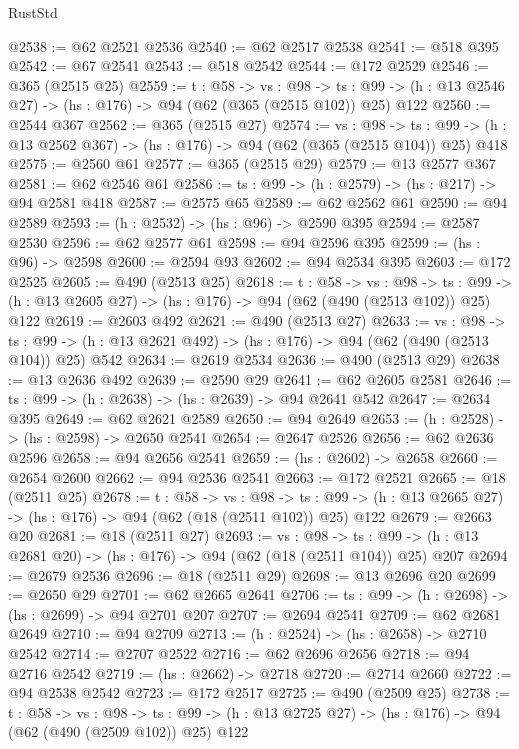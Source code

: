 \begin{lexlean}{RustStd}
\begin{coremodule}
@2538 := @62 @2521 @2536
@2540 := @62 @2517 @2538
@2541 := @518 @395
@2542 := @67 @2541
@2543 := @518 @2542
@2544 := @172 @2529
@2546 := @365 (@2515 @25)
@2559 := {t : @58} ->
  {vs : @98} ->
  {ts : @99} -> (h : @13 @2546 @27) -> (hs : @176) -> @94 (@62 (@365 (@2515 @102)) @25) @122
@2560 := @2544 @367
@2562 := @365 (@2515 @27)
@2574 := {vs : @98} ->
  {ts : @99} -> (h : @13 @2562 @367) -> (hs : @176) -> @94 (@62 (@365 (@2515 @104)) @25) @418
@2575 := @2560 @61
@2577 := @365 (@2515 @29)
@2579 := @13 @2577 @367
@2581 := @62 @2546 @61
@2586 := {ts : @99} -> (h : @2579) -> (hs : @217) -> @94 @2581 @418
@2587 := @2575 @65
@2589 := @62 @2562 @61
@2590 := @94 @2589
@2593 := (h : @2532) -> (hs : @96) -> @2590 @395
@2594 := @2587 @2530
@2596 := @62 @2577 @61
@2598 := @94 @2596 @395
@2599 := (hs : @96) -> @2598
@2600 := @2594 @93
@2602 := @94 @2534 @395
@2603 := @172 @2525
@2605 := @490 (@2513 @25)
@2618 := {t : @58} ->
  {vs : @98} ->
  {ts : @99} -> (h : @13 @2605 @27) -> (hs : @176) -> @94 (@62 (@490 (@2513 @102)) @25) @122
@2619 := @2603 @492
@2621 := @490 (@2513 @27)
@2633 := {vs : @98} ->
  {ts : @99} -> (h : @13 @2621 @492) -> (hs : @176) -> @94 (@62 (@490 (@2513 @104)) @25) @542
@2634 := @2619 @2534
@2636 := @490 (@2513 @29)
@2638 := @13 @2636 @492
@2639 := @2590 @29
@2641 := @62 @2605 @2581
@2646 := {ts : @99} -> (h : @2638) -> (hs : @2639) -> @94 @2641 @542
@2647 := @2634 @395
@2649 := @62 @2621 @2589
@2650 := @94 @2649
@2653 := (h : @2528) -> (hs : @2598) -> @2650 @2541
@2654 := @2647 @2526
@2656 := @62 @2636 @2596
@2658 := @94 @2656 @2541
@2659 := (hs : @2602) -> @2658
@2660 := @2654 @2600
@2662 := @94 @2536 @2541
@2663 := @172 @2521
@2665 := @18 (@2511 @25)
@2678 := {t : @58} ->
  {vs : @98} ->
  {ts : @99} -> (h : @13 @2665 @27) -> (hs : @176) -> @94 (@62 (@18 (@2511 @102)) @25) @122
@2679 := @2663 @20
@2681 := @18 (@2511 @27)
@2693 := {vs : @98} ->
  {ts : @99} -> (h : @13 @2681 @20) -> (hs : @176) -> @94 (@62 (@18 (@2511 @104)) @25) @207
@2694 := @2679 @2536
@2696 := @18 (@2511 @29)
@2698 := @13 @2696 @20
@2699 := @2650 @29
@2701 := @62 @2665 @2641
@2706 := {ts : @99} -> (h : @2698) -> (hs : @2699) -> @94 @2701 @207
@2707 := @2694 @2541
@2709 := @62 @2681 @2649
@2710 := @94 @2709
@2713 := (h : @2524) -> (hs : @2658) -> @2710 @2542
@2714 := @2707 @2522
@2716 := @62 @2696 @2656
@2718 := @94 @2716 @2542
@2719 := (hs : @2662) -> @2718
@2720 := @2714 @2660
@2722 := @94 @2538 @2542
@2723 := @172 @2517
@2725 := @490 (@2509 @25)
@2738 := {t : @58} ->
  {vs : @98} ->
  {ts : @99} -> (h : @13 @2725 @27) -> (hs : @176) -> @94 (@62 (@490 (@2509 @102)) @25) @122

\end{coremodule}
\end{lexlean}
